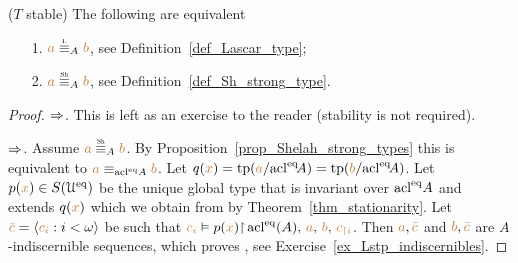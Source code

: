 \documentclass[creche.tex]{subfiles}
\begin{document}
\begin{corollary}
($T$ stable) 
The following are equivalent
\begin{itemize}
\item[1.] ${\mr a}\equivL_A{\mr b}$, see Definition~\ref{def_Lascar_type};
\item[2.] ${\mr a}\equivSh_A{\mr b}$, see Definition~\ref{def_Sh_strong_type}.
\end{itemize}
\end{corollary}
\begin{proof}$\Rightarrow$.
  This is left as an exercise to the reader (stability is not required).

  $\Rightarrow$.
  Assume ${\mr a}\equivSh_A{\mr b}$.
  By Proposition~\ref{prop_Shelah_strong_types} this is equivalent to ${\color{brown} a}\equiv_{\mathop{\rm acl}^{{\rm eq}}\!A}{\color{brown} b}$.
  Let $q({\color{brown} x})={\rm tp}({\color{brown} a}/{\mathop{\rm acl}}^{{\rm eq}}\!A)={\rm tp}({\color{brown} b}/{\mathop{\rm acl}}^{{\rm eq}}\!A)$. Let $p({\color{brown} x})\in S(\EuScript U^{{\rm eq}})$ be the unique global type that is invariant over $\mathop{\rm acl}^{{\rm eq}}\!A$ and extends $q({\color{brown} x})$ which we obtain from by Theorem~\ref{thm_stationarity}.
  Let ${\color{brown}\bar c}=\langle{\color{brown}c_i}:i<\omega\rangle$ be such that ${\color{brown} c_i}\vDash p({\color{brown} x}){\restriction}\mathop{\rm acl}^{{\rm eq}}(A),\,{\color{brown} a},\,{\color{brown} b},\,{\color{brown} c_{\restriction i}}$.
  Then ${\color{brown} a},{\color{brown}\bar c}$ and ${\color{brown} b},{\color{brown}\bar c}$ are $A$-indiscernible sequences, which proves , see Exercise~\ref{ex_Lstp_indiscernibles}.
\end{proof}


\end{document}
